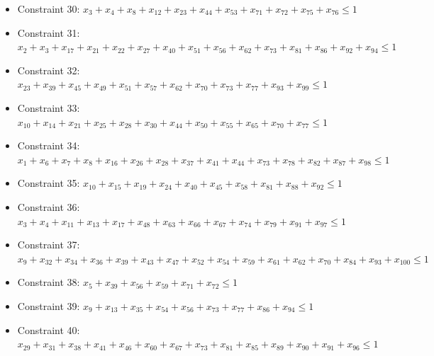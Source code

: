 \documentclass[11pt]{article}
\begin{document}
\begin{itemize}
\item Constraint 30: $x_{3} + x_{4} + x_{8} + x_{12} + x_{23} + x_{44} + x_{53} + x_{71} + x_{72} + x_{75} + x_{76} \le 1$
\item Constraint 31: $x_{2} + x_{3} + x_{17} + x_{21} + x_{22} + x_{27} + x_{40} + x_{51} + x_{56} + x_{62} + x_{73} + x_{81} + x_{86} + x_{92} + x_{94} \le 1$
\item Constraint 32: $x_{23} + x_{39} + x_{45} + x_{49} + x_{51} + x_{57} + x_{62} + x_{70} + x_{73} + x_{77} + x_{93} + x_{99} \le 1$
\item Constraint 33: $x_{10} + x_{14} + x_{21} + x_{25} + x_{28} + x_{30} + x_{44} + x_{50} + x_{55} + x_{65} + x_{70} + x_{77} \le 1$
\item Constraint 34: $x_{1} + x_{6} + x_{7} + x_{8} + x_{16} + x_{26} + x_{28} + x_{37} + x_{41} + x_{44} + x_{73} + x_{78} + x_{82} + x_{87} + x_{98} \le 1$
\item Constraint 35: $x_{10} + x_{15} + x_{19} + x_{24} + x_{40} + x_{45} + x_{58} + x_{81} + x_{88} + x_{92} \le 1$
\item Constraint 36: $x_{3} + x_{4} + x_{11} + x_{13} + x_{17} + x_{48} + x_{63} + x_{66} + x_{67} + x_{74} + x_{79} + x_{91} + x_{97} \le 1$
\item Constraint 37: $x_{9} + x_{32} + x_{34} + x_{36} + x_{39} + x_{43} + x_{47} + x_{52} + x_{54} + x_{59} + x_{61} + x_{62} + x_{70} + x_{84} + x_{93} + x_{100} \le 1$
\item Constraint 38: $x_{5} + x_{39} + x_{56} + x_{59} + x_{71} + x_{72} \le 1$
\item Constraint 39: $x_{9} + x_{13} + x_{35} + x_{54} + x_{56} + x_{73} + x_{77} + x_{86} + x_{94} \le 1$
\item Constraint 40: $x_{29} + x_{31} + x_{38} + x_{41} + x_{46} + x_{60} + x_{67} + x_{73} + x_{81} + x_{85} + x_{89} + x_{90} + x_{91} + x_{96} \le 1$
\end{itemize}
\end{document}
